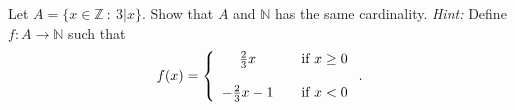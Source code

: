 \documentclass{article}
\newcommand{\Z}{\mathbb{Z}}
\newcommand{\N}{\mathbb{N}}
\theoremstyle{definition}
\begin{document}
\begin{question}
    Let $A = \{ x \in \Z ~:~ 3|x \}$.  Show that $A$ and $\mathbb{N}$ has the same cardinality.  {\it Hint:} Define $f: A \rightarrow \N$ such that
\[ f(x) =\left\{\begin{array}{c c l} \frac{2}{3}x & & \text{if } x \geq 0 \\ ~ \\ -\frac{2}{3}x - 1 &  & \text{if } x < 0 \end{array} \right. .\]
\end{question}
\begin{solution}
\end{solution}
\end{document}
